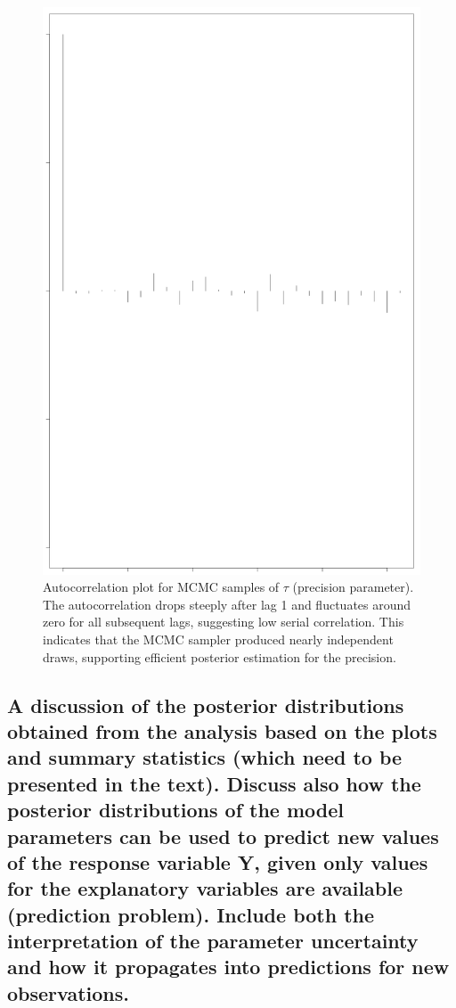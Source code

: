 \documentclass[]{article}
\begin{document}
\begin{figure}
	\centering
	\includegraphics[width=0.7\linewidth]{img/img-autocorr-tao}
	\caption{Autocorrelation plot for MCMC samples of $\tau$ (precision parameter). The autocorrelation drops steeply after lag 1 and fluctuates around zero for all subsequent lags, suggesting low serial correlation. This indicates that the MCMC sampler produced nearly independent draws, supporting efficient posterior estimation for the precision.}
	\label{fig:img-autocorr-tao}
\end{figure}



\subsection{A discussion of the posterior distributions obtained from the analysis based on the
plots and summary statistics (which need to be presented in the text). Discuss also
how the posterior distributions of the model parameters can be used to predict new
values of the response variable Y, given only values for the explanatory variables
are available (prediction problem). Include both the interpretation of the parameter
uncertainty and how it propagates into predictions for new observations.}
\end{document}
